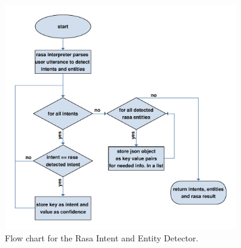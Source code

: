 \begin{figure}[!h]
    \centering
    \includegraphics[width=0.9\textwidth]{img/Intent_entity_detector.pdf}
    \caption{Flow chart for the Rasa Intent and Entity Detector.}
    \label{fig:flowIntandEnt}
\end{figure}

